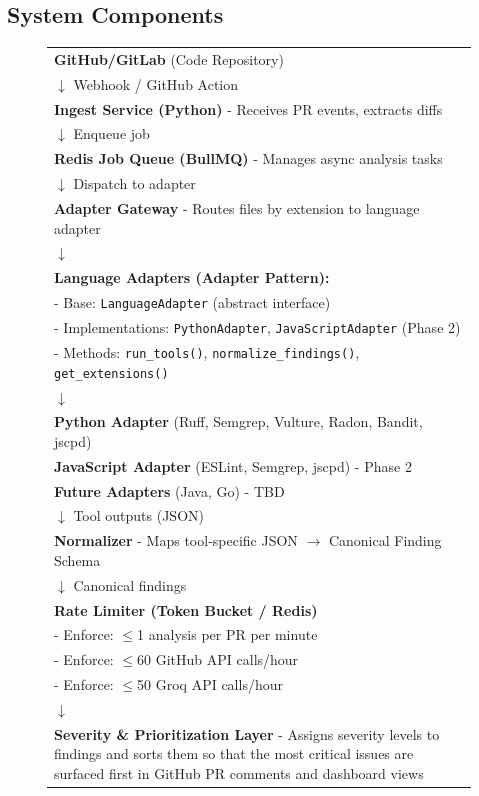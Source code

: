 \documentclass[11pt,a4paper]{article}
\begin{document}
\subsection{System Components}

\begin{figure}[h]
\centering
\small
\begin{tabular}{p{\textwidth}}
\textbf{GitHub/GitLab} (Code Repository) \\
$\downarrow$ Webhook / GitHub Action \\
\textbf{Ingest Service (Python)} - Receives PR events, extracts diffs \\
$\downarrow$ Enqueue job \\
\textbf{Redis Job Queue (BullMQ)} - Manages async analysis tasks \\
$\downarrow$ Dispatch to adapter \\
\textbf{Adapter Gateway} - Routes files by extension to language adapter \\
$\downarrow$ \\
\textbf{Language Adapters (Adapter Pattern):} \\
- Base: \texttt{LanguageAdapter} (abstract interface) \\
- Implementations: \texttt{PythonAdapter}, \texttt{JavaScriptAdapter} (Phase 2) \\
- Methods: \texttt{run\_tools()}, \texttt{normalize\_findings()}, \texttt{get\_extensions()} \\
$\downarrow$ \\
\textbf{Python Adapter} (Ruff, Semgrep, Vulture, Radon, Bandit, jscpd) \\
\textbf{JavaScript Adapter} (ESLint, Semgrep, jscpd) - Phase 2 \\
\textbf{Future Adapters} (Java, Go) - TBD \\
$\downarrow$ Tool outputs (JSON) \\
\textbf{Normalizer} - Maps tool-specific JSON $\rightarrow$ Canonical Finding Schema \\
$\downarrow$ Canonical findings \\
\textbf{Rate Limiter (Token Bucket / Redis)} \\
- Enforce: $\leq$1 analysis per PR per minute \\
- Enforce: $\leq$60 GitHub API calls/hour \\
- Enforce: $\leq$50 Groq API calls/hour \\
$\downarrow$ \\
\textbf{Severity \& Prioritization Layer} - Assigns severity levels to findings and sorts them so that the most critical issues are surfaced first in GitHub PR comments and dashboard views \\

\end{tabular}
\end{figure}
\end{document}
